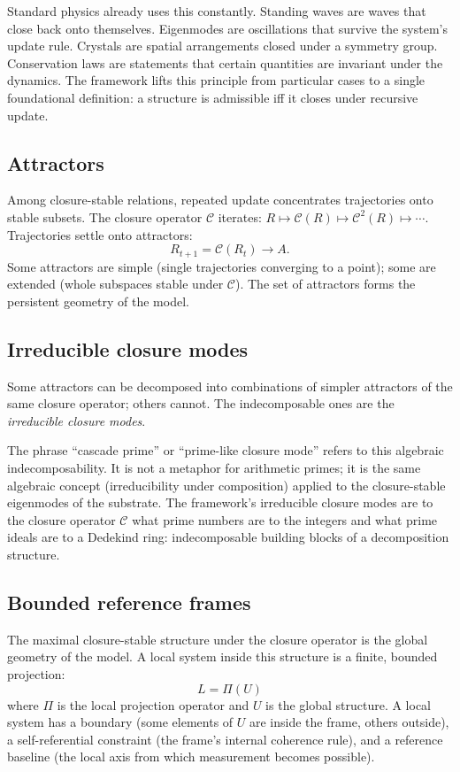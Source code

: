 \documentclass[11pt]{article}
\theoremstyle{plain}
\theoremstyle{definition}
\theoremstyle{remark}
\newcommand{\Ccal}{\mathcal{C}}
\begin{document}
Standard physics already uses this constantly. Standing waves are waves that close back onto themselves. Eigenmodes are oscillations that survive the system's update rule. Crystals are spatial arrangements closed under a symmetry group. Conservation laws are statements that certain quantities are invariant under the dynamics. The framework lifts this principle from particular cases to a single foundational definition: a structure is admissible iff it closes under recursive update.

\subsection{Attractors}

Among closure-stable relations, repeated update concentrates trajectories onto stable subsets. The closure operator $\Ccal$ iterates: $R \mapsto \Ccal(R) \mapsto \Ccal^2(R) \mapsto \cdots$. Trajectories settle onto attractors:
\[
  R_{t+1} = \Ccal(R_t) \to A.
\]
Some attractors are simple (single trajectories converging to a point); some are extended (whole subspaces stable under $\Ccal$). The set of attractors forms the persistent geometry of the model.

\subsection{Irreducible closure modes}

Some attractors can be decomposed into combinations of simpler attractors of the same closure operator; others cannot. The indecomposable ones are the \emph{irreducible closure modes}.

The phrase ``cascade prime'' or ``prime-like closure mode'' refers to this algebraic indecomposability. It is not a metaphor for arithmetic primes; it is the same algebraic concept (irreducibility under composition) applied to the closure-stable eigenmodes of the substrate. The framework's irreducible closure modes are to the closure operator $\Ccal$ what prime numbers are to the integers and what prime ideals are to a Dedekind ring: indecomposable building blocks of a decomposition structure.

\subsection{Bounded reference frames}

The maximal closure-stable structure under the closure operator is the global geometry of the model. A local system inside this structure is a finite, bounded projection:
\[
  L = \Pi(U)
\]
where $\Pi$ is the local projection operator and $U$ is the global structure. A local system has a boundary (some elements of $U$ are inside the frame, others outside), a self-referential constraint (the frame's internal coherence rule), and a reference baseline (the local axis from which measurement becomes possible).
\end{document}
